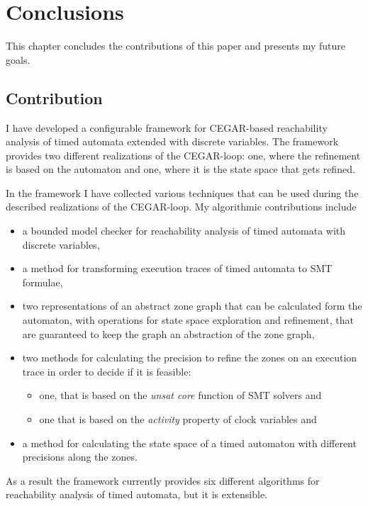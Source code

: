 \chapter{Conclusions}

This chapter concludes the contributions of this paper and presents my future goals.

\section{Contribution}

I have developed a configurable framework for CEGAR-based reachability analysis of timed automata extended with discrete variables. The framework provides two different realizations of the CEGAR-loop: one, where the refinement is based on the automaton and one, where it is the state space that gets refined.

In the framework I have collected various techniques that can be used during the described realizations of the CEGAR-loop. My algorithmic contributions include
\begin{itemize}
	\item a bounded model checker for reachability analysis of timed automata with discrete variables,
	\item a method for transforming execution traces of timed automata to SMT formulae, %
	\item two representations of an abstract zone graph that can be calculated form the automaton, with operations for state space exploration and refinement, that are guaranteed to keep the graph an abstraction of the zone graph,
	\item two methods for calculating the precision to refine the zones on an execution trace in order to decide if it is feasible:
	\begin{itemize}
		\item one, that is based on the \emph{unsat core} function of SMT solvers and
		\item one that is based on the \emph{activity} property of clock variables and
	\end{itemize}
	\item a method for calculating the state space of a timed automaton with different precisions along the zones.
\end{itemize}

As a result the framework currently provides six different algorithms for reachability analysis of timed automata, but it is extensible.


